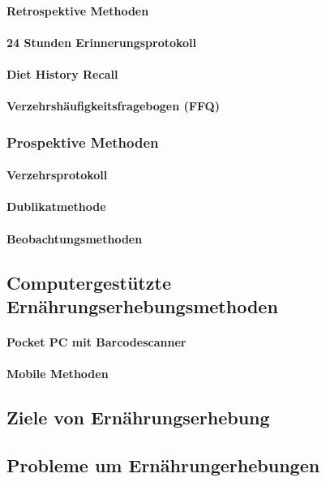 \paragraph{Retrospektive Methoden}

\paragraph{24 Stunden Erinnerungsprotokoll}


\paragraph{Diet History Recall}


\paragraph{Verzehrshäufigkeitsfragebogen (FFQ)}


\subsubsection{Prospektive Methoden}

\paragraph{Verzehrsprotokoll}

\paragraph{Dublikatmethode}

\paragraph{Beobachtungsmethoden}


\subsection{Computergestützte Ernährungserhebungsmethoden}

\paragraph{Pocket PC mit Barcodescanner}


\paragraph{Mobile Methoden}

\subsection{Ziele von Ernährungserhebung}

\subsection{Probleme um Ernährungerhebungen}

